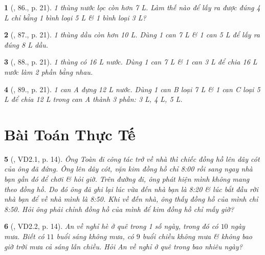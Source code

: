 \documentclass{article}
\newtheorem{baitoan}{}
\begin{document}
\begin{baitoan}[\cite{Tuyen_Toan_6}, 86., p. 21]
	1 thùng nước lọc còn hơn {\rm7 L}. Làm thế nào để lấy ra được đúng {\rm4 L} chỉ bằng 1 bình loại {\rm5 L} \& 1 bình loại {\rm3 L}?
\end{baitoan}

\begin{baitoan}[\cite{Tuyen_Toan_6}, 87., p. 21]
	1 thùng dầu còn hơn {\rm10 L}. Dùng 1 can {\rm7 L} \& 1 can {\rm5 L} để lấy ra đúng {\rm8 L} dầu.
\end{baitoan}

\begin{baitoan}[\cite{Tuyen_Toan_6}, 88., p. 21]
	1 thùng có {\rm16 L} nước. Dùng 1 can {\rm7 L} \& 1 can {\rm3 L} để chia {\rm16 L} nước làm 2 phần bằng nhau.
\end{baitoan}

\begin{baitoan}[\cite{Tuyen_Toan_6}, 89., p. 21]
	1 can A đựng {\rm12 L} nước. Dùng 1 can B loại {\rm7 L} \& 1 can C loại {\rm5 L} để chia {\rm12 L} trong can A thành 3 phần: {\rm3 L, 4 L, 5 L}.
\end{baitoan}


\section{Bài Toán Thực Tế}

\begin{baitoan}[\cite{TLCT_THCS_Toan_6_so_hoc}, VD2.1, p. 14]
	Ông Toàn đi công tác trở về nhà thì chiếc đồng hồ lên dây cót của ông đã đứng. Ông lên dây cót, vặn kim đồng hồ chỉ {\rm8:00} rồi sang ngay nhà bạn gần đó để chơi \& hỏi giờ. Trên đường đi, ông phát hiện mình không mang theo đồng hồ. Do đó ông đã ghi lại lúc vừa đến nhà bạn là {\rm8:20} \& lúc bắt đầu rời nhà bạn để về nhà mình là {\rm8:50}. Khi về đến nhà, ông thấy đồng hồ của mình chỉ {\rm8:50}. Hỏi ông phải chỉnh đồng hồ của mình để kim đồng hồ chỉ mấy giờ?
\end{baitoan}

\begin{baitoan}[\cite{TLCT_THCS_Toan_6_so_hoc}, VD2.2, p. 14]
	An về nghỉ hè ở quê trong 1 số ngày, trong đó có $10$ ngày mưa. Biết có $11$ buổi sáng không mưa, có $9$ buổi chiều không mưa \& không bao giờ trời mưa cả sáng lẫn chiều. Hỏi An về nghỉ ở quê trong bao nhiêu ngày?
\end{baitoan}
\end{document}
